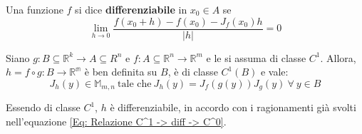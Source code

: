 \begin{definition} \label{Def: Differenziabilità di f. vettoriali}
    Una funzione $f$ si dice \textbf{differenziabile} in $x_0 \in A$ se
    \begin{equation}
        \lim_{h \to 0}{\frac{f(x_0+h)-f(x_0)-J_f(x_0)h}{|h|}}=0
    \end{equation}
\end{definition}
\begin{theorem} \label{Teo: Derivata composta di f. vettoriali}
Siano $g: B \subseteq \mathbb{R}^k \to A \subseteq R^n$ e $f: A \subseteq \mathbb{R}^n \to \mathbb{R}^m$ e le si assuma di classe $C^1$. Allora, $h=f \circ g: B \to \mathbb{R^m}$ è ben definita su $B$, è di classe $C^1(B)$ e vale:
\begin{equation}
    J_h(y) \in \mathbb{M}_{m,n}\ \text{tale che}\ J_h(y)=J_f(g(y)) J_g(y)\ \forall\ y \in B
\end{equation}
\end{theorem}
\begin{oss}
    Essendo di classe $C^1$, $h$ è differenziabile, in accordo con i ragionamenti già svolti nell'equazione \eqref{Eq: Relazione C^1 -> diff -> C^0}.
\end{oss}